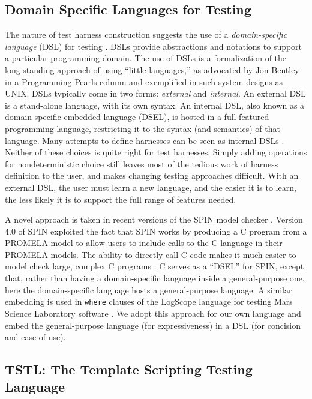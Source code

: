
\subsection{Domain Specific Languages for Testing}

The nature of test harness construction suggests the use of a
\emph{domain-specific language} (DSL) for testing \cite{ISOLA12}.  DSLs
\cite{Fow10} provide abstractions and notations to support a
particular programming domain. The use of DSLs is a formalization of
the long-standing approach of using ``little languages,'' as advocated by Jon Bentley in a
Programming Pearls column \cite{LitLang} and exemplified in such system
designs as UNIX.  DSLs typically come in two forms: \emph{external}
and \emph{internal}.  An external DSL is a stand-alone language, with
its own syntax.  An internal DSL, also known as a domain-specific
embedded language (DSEL), is hosted in a full-featured programming
language, restricting it to the syntax (and semantics) of that
language.  Many attempts to define harnesses can be seen as internal
DSLs \cite{UDITA,ISSRE12,JPF2,CBMCp,KLEE}.  Neither of these choices
is quite right for test harnesses.  Simply adding operations for
nondeterministic choice still leaves most of
the tedious work of harness definition to the user, and makes changing
testing approaches difficult.  With an external DSL, the user
must learn a new language, and the easier it is to learn, the less
likely it is to support the full range of features needed.

A novel approach is taken in recent versions of the SPIN model checker
\cite{SPIN}.  Version 4.0 of SPIN \cite{ModelDriven} exploited the
fact that SPIN works by producing a C program from a PROMELA model
to allow users to include calls to the C language in their PROMELA models.  The
ability to directly call C code makes it much easier to model check
large, complex C programs \cite{AMAI,ModelCode}.  C serves as a
``DSEL'' for SPIN, except that, rather than having a domain-specific
language inside a general-purpose one, here the domain-specific
language hosts a general-purpose language.  A similar embedding is
used in {\tt where} clauses of the LogScope language for testing Mars
Science Laboratory software \cite{scriptstospecs}.  We adopt this
approach for our own language and embed the general-purpose language (for expressiveness) in a
DSL (for concision and ease-of-use).

\subsection{TSTL: The Template Scripting Testing Language}

